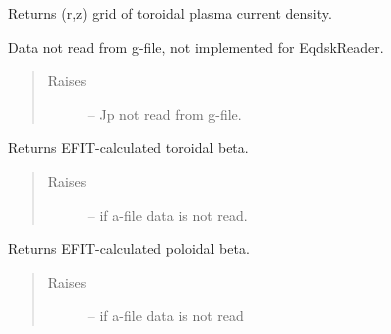 \documentclass[letterpaper,10pt,english]{sphinxmanual}
\begin{document}
\begin{fulllineitems}
\begin{fulllineitems}
\begin{quote}
\begin{description}
\end{description}\end{quote}

\end{fulllineitems}


\begin{fulllineitems}
\label{eqtools:eqtools.eqdskreader.EqdskReader.getJp}
Returns (r,z) grid of toroidal plasma current density.

Data not read from g-file, not implemented for EqdskReader.
\begin{quote}\begin{description}
\item[{Raises }] \leavevmode
{} -- 
Jp not read from g-file.

\end{description}\end{quote}

\end{fulllineitems}


\begin{fulllineitems}
\label{eqtools:eqtools.eqdskreader.EqdskReader.getBetaT}
Returns EFIT-calculated toroidal beta.
\begin{quote}\begin{description}
\item[{Raises }] \leavevmode
{} -- 
if a-file data is not read.

\end{description}\end{quote}

\end{fulllineitems}


\begin{fulllineitems}
\label{eqtools:eqtools.eqdskreader.EqdskReader.getBetaP}
Returns EFIT-calculated poloidal beta.
\begin{quote}\begin{description}
\item[{Raises }] \leavevmode
{} -- 
if a-file data is not read


\end{description}
\end{quote}
\end{fulllineitems}
\end{fulllineitems}
\end{document}
